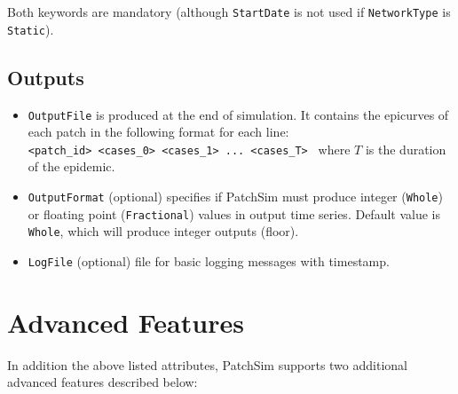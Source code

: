 \documentclass[10pt]{scrartcl}
\theoremstyle{definition}
\begin{document}
Both keywords are mandatory (although \verb|StartDate| is not used if 
\verb|NetworkType| is \verb|Static|). 

\subsection{Outputs}
\begin{itemize}
	\item \verb|OutputFile| is produced at the end of simulation. It contains 
	the epicurves of each patch in the following format for each line:\\
	\verb|<patch_id> <cases_0> <cases_1> ... <cases_T> |
	where $T$ is the duration of the epidemic.
	\item \verb|OutputFormat| (optional) specifies if PatchSim must produce 
	integer (\verb|Whole|) or floating point (\verb|Fractional|) values in 
	output time series. Default value is \verb|Whole|, which will produce 
	integer outputs (floor).
	\item \verb|LogFile| (optional) file for basic logging messages with 
	timestamp. 
\end{itemize}

\section{Advanced Features}
In addition the above listed attributes, PatchSim supports two additional 
advanced features described below:
\end{document}

